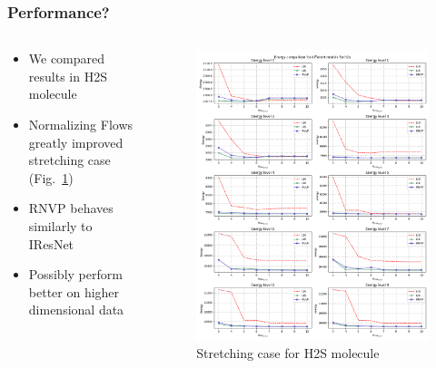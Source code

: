 \begin{frame}
    \frametitle{Performance?}
    \begin{columns}
        \begin{column}[t]{0.48\textwidth}
            \begin{itemize}[<+->]
                \setlength\itemsep{.8em}
                \item We compared results in H2S molecule
                \item Normalizing Flows greatly improved stretching case (Fig.~\ref{fig:enrs_stretch_2D})
                \item RNVP behaves similarly to IResNet
                \item Possibly perform better on higher dimensional data
            \end{itemize}
        \end{column}
        \begin{column}[t]{0.48\textwidth}
            \begin{figure}
                \includegraphics[width=\textwidth]{img/enrs_stretch_2D.png}
                \caption{Stretching case for H2S molecule}
                \label{fig:enrs_stretch_2D}
            \end{figure}
        \end{column}
    \end{columns}
\end{frame}